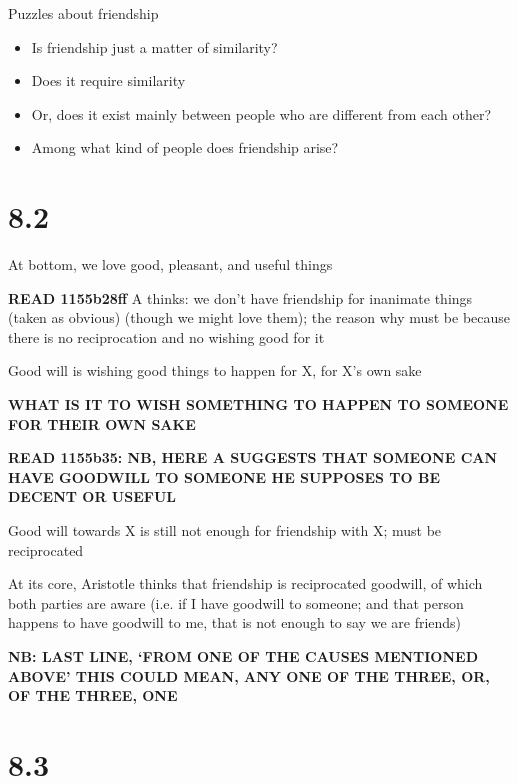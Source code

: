 \documentclass[11pt]{article}
\begin{document}
\noindent Puzzles about friendship

\begin{itemize}\item{Is friendship just a matter of similarity?}\item{Does it require similarity}\item{Or, does it exist mainly between people who are different from each other?}\item{Among what kind of people does friendship arise?}\end{itemize}

\section*{8.2}

\noindent At bottom, we love good, pleasant, and useful things 
\vspace*{2mm}

\noindent\textbf{READ 1155b28ff} A thinks: we don't have friendship for inanimate things (taken as obvious) (though we might love them); the reason why must be because there is no reciprocation and no wishing good for it
\vspace*{2mm}

\noindent Good will is wishing good things to happen for X, for X's own sake
\vspace*{2mm}

\noindent\textbf{WHAT IS IT TO WISH SOMETHING TO HAPPEN TO SOMEONE FOR THEIR OWN SAKE}
\vspace*{2mm}

\noindent \textbf{READ 1155b35: NB, HERE A SUGGESTS THAT SOMEONE CAN HAVE GOODWILL TO SOMEONE HE SUPPOSES TO BE DECENT OR USEFUL}

\noindent Good will towards X is still not enough for friendship with X; must be reciprocated

\noindent At its core, Aristotle thinks that friendship is reciprocated goodwill, of which both parties are aware (i.e. if I have goodwill to someone; and that person happens to have goodwill to me, that is not enough to say we are friends)
\vspace*{2mm}

\noindent \textbf{NB: LAST LINE, `FROM ONE OF THE CAUSES MENTIONED ABOVE' THIS COULD MEAN, ANY ONE OF THE THREE, OR, OF THE THREE, ONE}

\section*{8.3}
\end{document}

